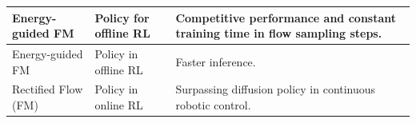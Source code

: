 \begin{xltabular}{\linewidth}{p{3.5cm} p{3.5cm} X}
\hline
Energy-guided FM \citep{alles2025flowqenergyguidedflowpolicies} & Policy for offline RL & Competitive performance and constant training time in flow sampling steps. \\
\hline
Energy-guided FM \citep{zhang2025energyweightedflowmatchingoffline} & Policy in offline RL & Faster inference.\\
\hline
Rectified Flow (FM) \citep{zhang2025reinflowfinetuningflowmatching} & Policy in online RL & Surpassing diffusion policy in continuous robotic control.\\
\hline
\hline
\end{xltabular}